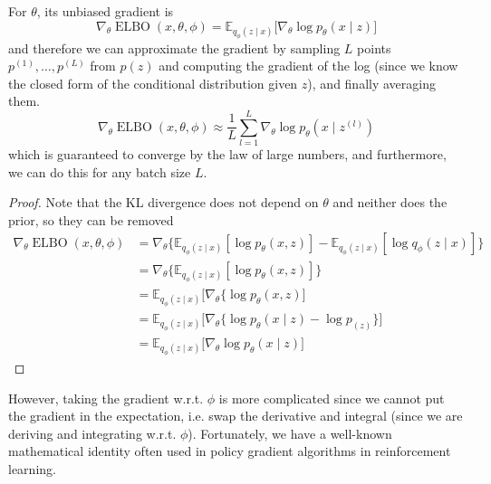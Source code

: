 \documentclass{article}
\DeclareMathOperator{\elbo}{ELBO}
\begin{document}
  \begin{lemma}
    \label{thm:gradient-of-elbo-w-r-t-theta}
    For $\theta$, its unbiased gradient is 
    \begin{equation}
      \nabla_\theta \elbo(x, \theta, \phi) = \mathbb{E}_{q_\phi (z \mid x)} \big[ \nabla_\theta \log p_\theta (x \mid z) \big]
    \end{equation}
    and therefore we can approximate the gradient by sampling $L$ points $p^{(1)}, \ldots, p^{(L)}$ from $p(z)$ and computing the gradient of the log (since we know the closed form of the conditional distribution given $z$), and finally averaging them. 
    \begin{equation}
      \nabla_\theta \elbo(x, \theta, \phi) \approx \frac{1}{L} \sum_{l=1}^L \nabla_\theta \log p_\theta (x \mid z^{(l)})
    \end{equation}
    which is guaranteed to converge by the law of large numbers, and furthermore, we can do this for any batch size $L$.  
  \end{lemma}
  \begin{proof}
    Note that the KL divergence does not depend on $\theta$ and neither does the prior, so they can be removed 
    \begin{align} 
      \nabla_\theta \elbo(x, \theta, \phi) & = \nabla_\theta \big\{ \mathbb{E}_{q_\phi (z \mid x)} [ \log p_\theta (x, z)] - \mathbb{E}_{q_\phi (z \mid x)} [\log q_{\phi} (z \mid x)] \} \\ 
                                           & = \nabla_\theta \big\{ \mathbb{E}_{q_\phi (z \mid x)} [ \log p_\theta (x, z)] \} \\ 
                                           & = \mathbb{E}_{q_\phi (z \mid x)} \big[ \nabla_\theta \{ \log p_\theta (x, z) \big] \\
                                           & = \mathbb{E}_{q_\phi (z \mid x)} \big[ \nabla_\theta \{ \log p_\theta (x \mid z) - \log p_(z) \} \big] \\
                                           & = \mathbb{E}_{q_\phi (z \mid x)} \big[ \nabla_\theta \log p_\theta (x \mid z) \big] 
    \end{align}
  \end{proof}

  However, taking the gradient w.r.t. $\phi$ is more complicated since we cannot put the gradient in the expectation, i.e. swap the derivative and integral (since we are deriving and integrating w.r.t. $\phi$). Fortunately, we have a well-known mathematical identity often used in policy gradient algorithms in reinforcement learning. \cite{W92} 
\end{document}
